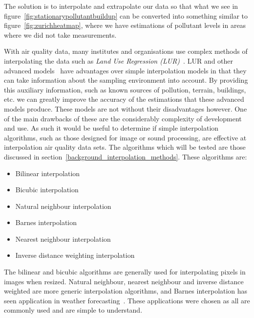 
		The solution is to interpolate and extrapolate our data so that what we see in figure~\ref{fig:stationarypollutantbuildup} can be converted into something similar to figure~\ref{fig:zurichheatmap}, where we have estimations of pollutant levels in areas where we did not take measurements. 

		With air quality data, many institutes and organisations use complex methods of interpolating the data such as \emph{Land Use Regression (LUR)}~\cite{lurtraffic}. LUR and other advanced models~\cite{reviewofaqmodels} have advantages over simple interpolation models in that they can take information about the sampling environment into account. By providing this auxiliary information, such as known sources of pollution, terrain, buildings, etc. we can greatly improve the accuracy of the estimations that these advanced models produce. These models are not without their disadvantages however. One of the main drawbacks of these are the considerably complexity of development and use. As such it would be useful to determine if simple interpolation algorithms, such as those designed for image or sound processing, are effective at interpolation air quality data sets. The algorithms which will be tested are those discussed in section~\ref{background_interpolation_methods}. These algorithms are: 

		\begin{itemize}
	        \item Bilinear interpolation
	        \item Bicubic interpolation
	        \item Natural neighbour interpolation
	        \item Barnes interpolation
	        \item Nearest neighbour interpolation
	        \item Inverse distance weighting interpolation
	    \end{itemize}

	    The bilinear and bicubic algorithms are generally used for interpolating pixels in images when resized. Natural neighbour, nearest neighbour and inverse distance weighted are more generic interpolation algorithms, and Barnes interpolation has seen application in weather forecasting~\cite{barnesinterpolation}. These applications were chosen as all are commonly used and are simple to understand. 



